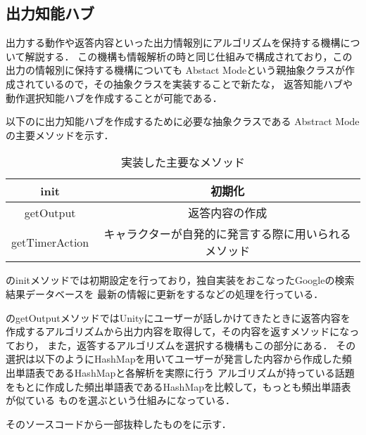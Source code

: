 

\subsection{出力知能ハブ}
出力する動作や返答内容といった出力情報別にアルゴリズムを保持する機構について解説する．
この機構も情報解析の時と同じ仕組みで構成されており，この出力の情報別に保持する機構についても
Abstact Modeという親抽象クラスが作成されているので，その抽象クラスを実装することで新たな，
返答知能ハブや動作選択知能ハブを作成することが可能である．

以下のに出力知能ハブを作成するために必要な抽象クラスである
Abstract Modeの主要メソッドを示す．\\

\begin{table}[tbh]
	\caption{実装した主要なメソッド} \label{tab:abstractmode}
	\begin{center}
		\begin{tabular}[htb]{c|c}
		\hline
		init & 初期化 \\
		\hline
		getOutput & 返答内容の作成 \\
		\hline
		getTimerAction & キャラクターが自発的に発言する際に用いられるメソッド \\
		\hline
		\end{tabular}
	\end{center}
\end{table}

のinitメソッドでは初期設定を行っており，独自実装をおこなったGoogleの検索結果データベースを
最新の情報に更新をするなどの処理を行っている．

のgetOutputメソッドではUnityにユーザーが話しかけてきたときに返答内容を
作成するアルゴリズムから出力内容を取得して，その内容を返すメソッドになっており，
また，返答するアルゴリズムを選択する機構もこの部分にある．
その選択は以下のようにHashMapを用いてユーザーが発言した内容から作成した頻出単語表であるHashMapと各解析を実際に行う
アルゴリズムが持っている話題をもとに作成した頻出単語表であるHashMapを比較して，もっとも頻出単語表が似ている
ものを選ぶという仕組みになっている．

そのソースコードから一部抜粋したものをに示す．


